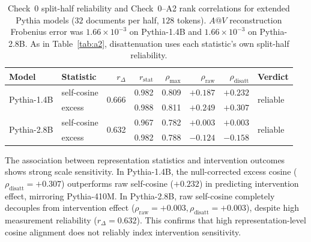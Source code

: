 \documentclass{article} %
\begin{document}
\begin{table}[h]
\centering
\small
\begin{tabular}{@{}llrrrrrl@{}}
\toprule
Model & Statistic & $r_\Delta$ & $r_{\text{stat}}$ & $\rho_{\max}$ & $\rho_{\text{raw}}$ & $\rho_{\text{disatt}}$ & Verdict \\
\midrule
\multirow{2}{*}{Pythia-1.4B}
  & self-cosine & \multirow{2}{*}{0.666} & 0.982 & 0.809 & $+0.187$ & $+0.232$ & \multirow{2}{*}{reliable} \\
  & excess      &                        & 0.988 & 0.811 & $+0.249$ & $+0.307$ & \\
\midrule
\multirow{2}{*}{Pythia-2.8B}
  & self-cosine & \multirow{2}{*}{0.632} & 0.967 & 0.782 & $+0.003$ & $+0.003$ & \multirow{2}{*}{reliable} \\
  & excess      &                        & 0.982 & 0.788 & $-0.124$ & $-0.158$ & \\
\bottomrule
\end{tabular}
\caption{Check~0 split-half reliability and Check~0--A2 rank correlations for extended Pythia models ($32$ documents per half, $128$ tokens). $A@V$ reconstruction Frobenius error was $1.66\times 10^{-3}$ on Pythia-1.4B and $1.66\times 10^{-3}$ on Pythia-2.8B. As in Table~\ref{tab:a2}, disattenuation uses each statistic's own split-half reliability.}
\label{tab:extended_reliability}
\end{table}

The association between representation statistics and intervention outcomes shows strong scale sensitivity. In Pythia-1.4B, the null-corrected excess cosine ($\rho_{\text{disatt}} = +0.307$) outperforms raw self-cosine ($+0.232$) in predicting intervention effect, mirroring Pythia-410M. In Pythia-2.8B, raw self-cosine completely decouples from intervention effect ($\rho_{\text{raw}} = +0.003, \rho_{\text{disatt}} = +0.003$), despite high measurement reliability ($r_\Delta = 0.632$). This confirms that high representation-level cosine alignment does not reliably index intervention sensitivity.
\end{document}
